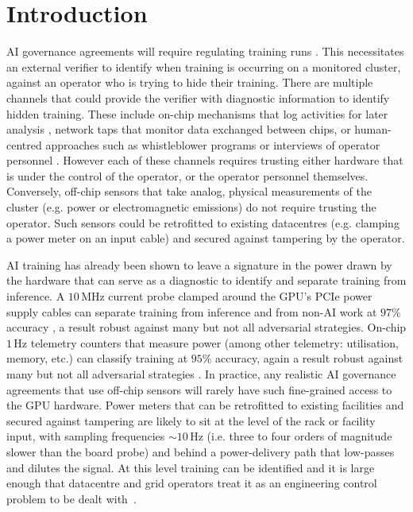 \documentclass{article}
\begin{document}
\section{Introduction}
\label{sec:intro}

AI governance agreements will require regulating training runs \citep{shavit2023chinchilla,sastry2024computing,baker2025verifying,heim2024thresholds}. This necessitates an external verifier to identify when training is occurring on a monitored cluster, against an operator who is trying to hide their training. There are multiple channels that could provide the verifier with diagnostic information to identify hidden training. These include on-chip mechanisms that log activities for later analysis \citep{shavit2023chinchilla,ogara2025hardware}, network taps that monitor data exchanged between chips, or human-centred approaches such as whistleblower programs or interviews of operator personnel \citep{baker2025verifying}. However each of these channels requires trusting either hardware that is under the control of the operator, or the operator personnel themselves. Conversely, off-chip sensors that take analog, physical measurements of the cluster (e.g. power or electromagnetic emissions) do not require trusting the operator. Such sensors could be retrofitted to existing datacentres (e.g. clamping a power meter on an input cable) and secured against tampering by the operator. 


AI training has already been shown to leave a signature in the power drawn by the hardware that can serve as a diagnostic to identify and separate training from inference. A $10$\,MHz current probe clamped around the GPU's PCIe power supply cables can separate training from
inference and from non-AI work at $97\%$ accuracy \citep{gargiulo2026workload}, a result robust against many but not all adversarial strategies. On-chip $1$\,Hz telemetry counters that measure power (among other telemetry: utilisation, memory, etc.) can classify training at $95\%$ accuracy, again a result robust against many but not all adversarial strategies \citep{rahman2026telemetry}. In practice, any realistic AI governance agreements that use off-chip sensors will rarely have such fine-grained access to the GPU hardware. Power meters that can be retrofitted to existing facilities and secured against tampering are likely to sit at the level of the rack or facility input, with sampling frequencies ${\sim}10$\,Hz (i.e. three to four orders of magnitude slower than the board probe) and behind a power-delivery path that low-passes and dilutes the signal. At this level training can be identified and it is large enough that datacentre and grid operators treat it as an engineering control problem to be dealt with~\citep{patel2023polca,ko2025widearea}. 
\end{document}
